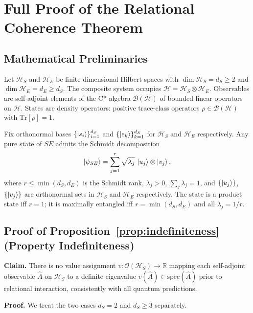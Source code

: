 
\section{Full Proof of the Relational Coherence Theorem}
\label{app:rct-proof}

\subsection{Mathematical Preliminaries}

Let $\mathcal{H}_S$ and $\mathcal{H}_E$ be finite-dimensional Hilbert spaces
with $\dim\mathcal{H}_S = d_S \geq 2$ and $\dim\mathcal{H}_E = d_E \geq d_S$.
The composite system occupies $\mathcal{H} = \mathcal{H}_S \otimes \mathcal{H}_E$.
Observables are self-adjoint elements of the C*-algebra
$\mathcal{B}(\mathcal{H})$ of bounded linear operators on $\mathcal{H}$.
States are density operators: positive trace-class operators
$\rho \in \mathcal{B}(\mathcal{H})$ with $\mathrm{Tr}[\rho] = 1$.

Fix orthonormal bases $\{\ket{s_i}\}_{i=1}^{d_S}$ and
$\{\ket{e_k}\}_{k=1}^{d_E}$ for $\mathcal{H}_S$ and $\mathcal{H}_E$
respectively.
Any pure state of $SE$ admits the Schmidt decomposition
\begin{equation}
  \ket{\psi_{SE}} = \sum_{j=1}^{r} \sqrt{\lambda_j}\,\ket{u_j}\otimes\ket{v_j},
  \label{eq:schmidt}
\end{equation}
where $r \leq \min(d_S, d_E)$ is the Schmidt rank, $\lambda_j > 0$,
$\sum_j \lambda_j = 1$, and $\{\ket{u_j}\}$, $\{\ket{v_j}\}$ are
orthonormal sets in $\mathcal{H}_S$ and $\mathcal{H}_E$ respectively.
The state is a product state iff $r = 1$; it is maximally entangled iff
$r = \min(d_S, d_E)$ and all $\lambda_j = 1/r$.

\subsection{Proof of Proposition~\ref{prop:indefiniteness} (Property Indefiniteness)}

\textbf{Claim.} There is no value assignment
$v: \mathcal{O}(\mathcal{H}_S) \to \mathbb{R}$
mapping each self-adjoint observable $\hat{A}$ on $\mathcal{H}_S$ to a
definite eigenvalue $v(\hat{A}) \in \mathrm{spec}(\hat{A})$ prior to
relational interaction, consistently with all quantum predictions.

\textbf{Proof.}
We treat the two cases $d_S = 2$ and $d_S \geq 3$ separately.

